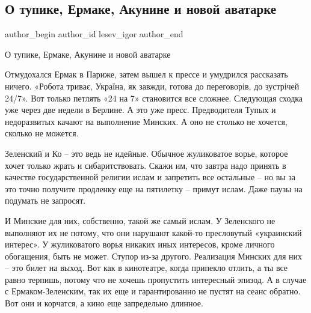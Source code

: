  
 
 
 
 
 
\subsection{О тупике, Ермаке, Акунине и новой аватарке}
\label{sec:27_01_2022.fb.lesev_igor.1.jermak_akunin_avatarka_patriotizm}
 
\ifcmt
 author_begin
   author_id lesev_igor
 author_end
\fi

О тупике, Ермаке, Акунине и новой аватарке

Отмудохался Ермак в Париже, затем вышел к прессе и умудрился рассказать ничего.
«Робота триває, Україна, як завжди, готова до переговорів, до зустрічей 24/7».
Вот только петлять «24 на 7» становится все сложнее. Следующая сходка уже через
две недели в Берлине. А это уже пресс. Предводителя Тупых и недоразвитых качают
на выполнение Минских. А оно не столько не хочется, сколько не можется.


Зеленский и Ко – это ведь не идейные. Обычное жуликоватое ворье, которое хочет
только жрать и сибаритствовать. Скажи им, что завтра надо принять в качестве
государственной религии ислам и запретить все остальные – но вы за это точно
получите продленку еще на пятилетку – примут ислам. Даже паузы на подумать не
запросят.

И Минские для них, собственно, такой же самый ислам. У Зеленского не выполняют
их не потому, что они нарушают какой-то пресловутый «украинский интерес». У
жуликоватого ворья никаких иных интересов, кроме личного обогащения, быть не
может. Ступор из-за другого. Реализация Минских для них – это билет на выход.
Вот как в кинотеатре, когда припекло отлить, а ты все равно терпишь, потому что
не хочешь пропустить интересный эпизод. А в случае с Ермаком-Зеленским, так их
еще и гарантированно не пустят на сеанс обратно. Вот они и корчатся, а кино еще
запредельно длинное.

